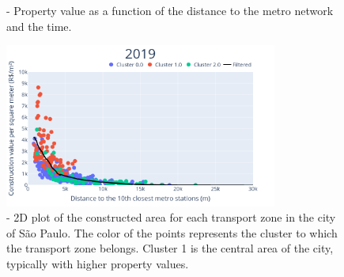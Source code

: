 \documentclass[12pt]{gsis} %
\begin{document}
\begin{figure}[ht]
	\centering
	\caption{- Property value as a function of the distance to the metro network and the time.}
	\label{fig:comparison}
\end{figure}

\begin{figure}[ht]
	\centering
	\includegraphics[width=0.8\textwidth]{figs/clusters_2019.png}
	\caption{- 2D plot of the constructed area for each transport zone in the city of São Paulo. The color of the points represents the cluster to which the transport zone belongs. Cluster 1 is the central area of the city, typically with higher property values.}
\end{figure}
\end{document}
